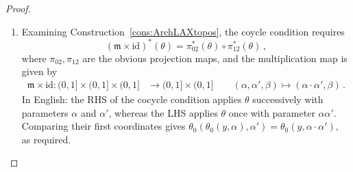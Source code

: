 \documentclass[a4paper, 11pt,reqno]{amsart}
\newcommand{\id}{\mathrm{id}}
\newcommand{\M}{\mathcal{M}}
\newcommand{\m}{\mathfrak{m}}
\begin{document}
\begin{proof}
\begin{enumerate}[label=(\roman*):]
		\item Examining Construction~\ref{cons:ArchLAXtopos}, the coycle condition requires $$(\m\times \id)^*(\theta)=\pi^*_{02}(\theta)\circ \pi^*_{12}(\theta)\,, $$
		where $\pi_{02},\pi_{12}$ are the obvious projection maps, and the multiplication map is given by
		\begin{align*}
		\m\times \id\colon (0,1]\times (0,1] \times (0,1] &\longrightarrow  (0,1]\times (0,1]\qquad (\alpha,\alpha',\beta)\longmapsto  (\alpha\cdot\alpha',\beta)\,.
		\end{align*}
In English: the RHS of the cocycle condition applies $\theta$ successively with parameters $\alpha$ and $\alpha'$, whereas the LHS applies $\theta$ once with parameter $\alpha\alpha'$. Comparing their first coordinates gives $\theta_0(\theta_0(y,\alpha),\alpha')=\theta_0(y,\alpha\cdot \alpha'),$ as required.
	\end{enumerate}
\end{proof}




\end{document}
